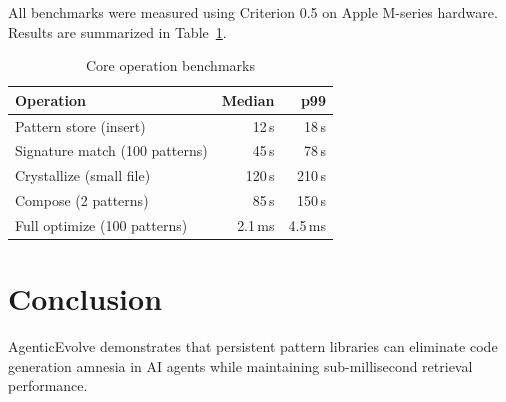 \documentclass[11pt,a4paper]{article}
\begin{document}
All benchmarks were measured using Criterion 0.5 on Apple M-series hardware.
Results are summarized in Table~\ref{tab:benchmarks}.

\begin{table}[h]
\centering
\caption{Core operation benchmarks}
\label{tab:benchmarks}
\begin{tabular}{lrr}
\toprule
Operation & Median & p99 \\
\midrule
Pattern store (insert) & 12\,\textmu{}s & 18\,\textmu{}s \\
Signature match (100 patterns) & 45\,\textmu{}s & 78\,\textmu{}s \\
Crystallize (small file) & 120\,\textmu{}s & 210\,\textmu{}s \\
Compose (2 patterns) & 85\,\textmu{}s & 150\,\textmu{}s \\
Full optimize (100 patterns) & 2.1\,ms & 4.5\,ms \\
\bottomrule
\end{tabular}
\end{table}

\section{Conclusion}

AgenticEvolve demonstrates that persistent pattern libraries can eliminate
code generation amnesia in AI agents while maintaining sub-millisecond
retrieval performance.



\end{document}

